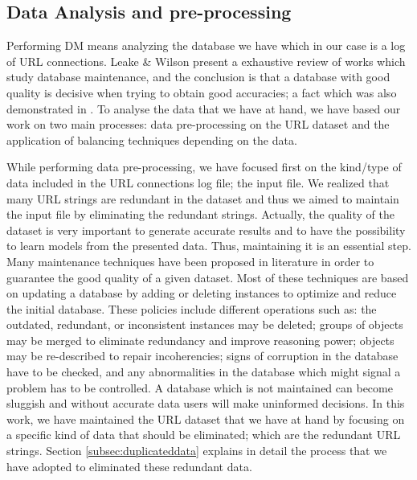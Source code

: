 \documentclass{llncs}
\begin{document}
\subsection{Data Analysis and pre-processing}
\label{subsec:dataanalysis}

Performing DM means analyzing the database we have \cite{Frank2011}
which in our case is a log of URL connections. Leake \& Wilson
\cite{wilson2001maintaining} present a exhaustive review of works which
study database maintenance, and the conclusion is that a database with
good quality is decisive when trying to obtain good accuracies; a fact
which was also demonstrated in \cite{zeineb2014thesis}. To analyse the
data that we have at hand, we have based our work on two main
processes: data pre-processing on
the URL dataset and the application of balancing
techniques depending on the data. %

While performing data pre-processing, we have focused first on the
kind/type of data included in the URL connections log file; the input
file. We realized %
 that many URL strings are redundant in the dataset and thus we aimed
 to maintain the input file by eliminating the redundant
 strings. Actually, the quality of the dataset is very important to
 generate accurate results and to have the possibility to learn models
 from the presented data. Thus, maintaining it is an essential
 step. Many maintenance techniques have been proposed in literature \cite{wilson2001maintaining} in order to guarantee the good quality of a given dataset.   Most of these techniques are based on updating a database by adding or deleting instances to optimize and reduce the initial database. 
These policies include different operations such as: the outdated, redundant, or inconsistent instances may be deleted; groups of objects may be merged to eliminate redundancy and improve reasoning power; objects may be re-described to repair incoherencies; signs of corruption in the database have to be checked, and any abnormalities in the database which might signal a problem has to be controlled. A database which is not maintained can become sluggish and without accurate data users will make uninformed decisions. In this work, we have maintained the URL dataset that we have at hand by focusing on a specific kind of data that should be eliminated; which are the redundant URL strings. Section \ref{subsec:duplicateddata} explains in detail the process that we have adopted to eliminated these redundant data.
\end{document}
